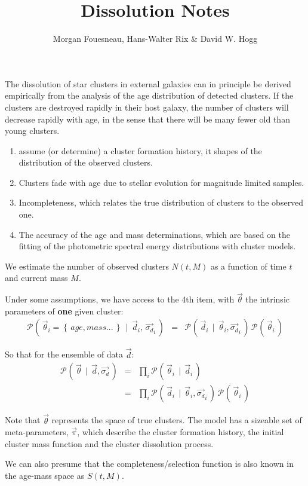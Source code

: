 \documentclass[a4paper]{article}
\title{Dissolution Notes}
\author{Morgan Fouesneau, Hans-Walter Rix \& David W. Hogg}
\newcommand{\given}{\ensuremath{\,\mid\,}}
\newcommand{\proba}[2][]{\ensuremath{\mathcal{P}_{#1}\left(\, #2 \,\right)}}
\newcommand{\set}[1]{\ensuremath{\left\{\,#1\,\right\}}}
\newcommand{\data}{\ensuremath{\overrightarrow{d}}}
\newcommand{\dataerr}{\ensuremath{\overrightarrow{\sigma_d}}}
\newcommand{\PI}{\ensuremath{\overrightarrow{\pi}}} %
\newcommand{\T}{\ensuremath{\overrightarrow{\theta}}} %
\begin{document}
\maketitle


The dissolution of star clusters in external galaxies can in principle be derived empirically from the analysis of the age distribution of detected clusters. If the clusters are destroyed rapidly in their host galaxy, the number of clusters will decrease rapidly with age, in the sense that there will be many fewer old than young clusters.
\begin{enumerate}
\item assume (or determine) a cluster formation history, it shapes of the distribution of the observed clusters.
\item Clusters fade with age due to stellar evolution for magnitude limited samples.
\item Incompleteness, which relates the true distribution of clusters to the observed one.
\item The accuracy of the age and mass determinations, which are based on the fitting of the photometric spectral energy distributions with cluster models.
\end{enumerate}

\medskip

We estimate the number of observed clusters $N(t, M)$ as a function of time $t$ and current mass $M$.


Under some assumptions, we have access to the 4th item, with $\T$ the intrinsic parameters of {\bf one} given cluster:
\begin{eqnarray}
\proba{\T_i = \set{age, mass...} \given \data_i,\, \dataerr_i} &=& \proba{ \data_i \given \T_i, \dataerr_i}\,\proba{\T_i}
\end{eqnarray}

So that for the ensemble of data $\data$:
\begin{eqnarray}
\proba{\T \given \data, \dataerr} &=& \prod_i \proba{\T_i \given \data_i}\\
                                                 &=& \prod_i \proba{ \data_i \given \T_i, \dataerr_i}\,\proba{\T_i}
\end{eqnarray}

Note that $\T$ represents the space of true clusters. The model has a sizeable set of meta-parameters, $\PI$, which describe the cluster formation history, the initial cluster mass function and the cluster dissolution process.


We can also presume that the completeness/selection function is also known in the age-mass space as $S(t, M)$.
\,\\
\end{document}
